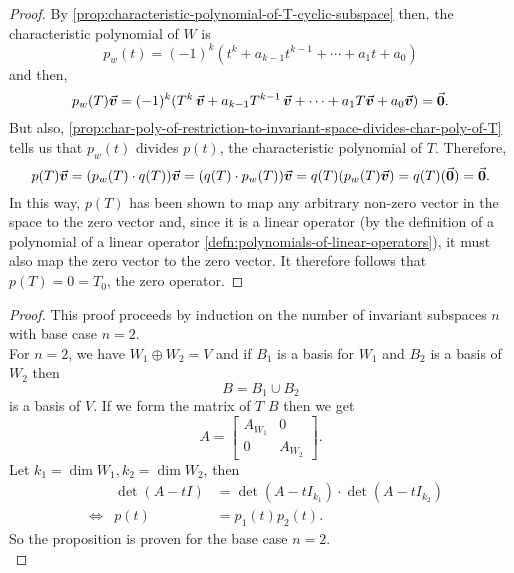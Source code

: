 \documentclass[../MathsNotesBase.tex]{subfiles}
\begin{document}
{\begin{proof}
			By \autoref{prop:characteristic-polynomial-of-T-cyclic-subspace} then, the characteristic polynomial of $W$ is
			\[ p_w(t) = (-1)^k (t^k + a_{k-1} t^{k-1} + \cdots + a_1 t + a_0) \]
			and then,
			\[ p_w(T)\vec{\bm{v}} = (-1)^k (T^k\,\vec{\bm{v}} + a_{k-1} T^{k-1}\,\vec{\bm{v}} + \cdots + a_1 T\vec{\bm{v}} + a_0\vec{\bm{v}}) = \vec{\bm{0}}. \]
			But also, \autoref{prop:char-poly-of-restriction-to-invariant-space-divides-char-poly-of-T} tells us that $p_w(t)$ divides $p(t)$, the characteristic polynomial of $T$. Therefore,
			\[ p(T)\vec{\bm{v}} = (p_w(T) \cdot q(T))\vec{\bm{v}} = (q(T) \cdot p_w(T))\vec{\bm{v}} = q(T)(p_w(T)\vec{\bm{v}}) = q(T)(\vec{\bm{0}}) = \vec{\bm{0}}. \]
			In this way, $p(T)$ has been shown to map any arbitrary non-zero vector in the space to the zero vector and, since it is a linear operator (by the definition of a polynomial of a linear operator \ref{defn:polynomials-of-linear-operators}), it must also map the zero vector to the zero vector. It therefore follows that ${ p(T) = 0 = T_0 }$, the zero operator.
		\end{proof}
	
	
		\bigskip
		\begin{proof}
			This proof proceeds by induction on the number of invariant subspaces $n$ with base case ${ n = 2 }$.\\
			
			For ${ n = 2 }$, we have ${ W_1 \oplus W_2 = V }$ and if $B_1$ is a basis for $W_1$ and $B_2$ is a basis of $W_2$ then
			\[ B = B_1 \cup B_2 \]
			is a basis of $V$. If we form the matrix of $T$ \wrt $B$ then we get
			\[ 
				A = \begin{bmatrix}
						A_{W_1} & 0\\
						0 & A_{W_2}
					\end{bmatrix}.
			\]
			Let ${ k_1 = \dim W_1, k_2 = \dim W_2 }$, then
			\[\begin{aligned}
				&& \det (A - tI) &= \det (A - tI_{k_1}) \cdot \det (A - tI_{k_2}) \\
				&\iff & p(t) &= p_1(t) p_2(t).
			\end{aligned}\]
			So the proposition is proven for the base case ${ n = 2 }$.\\
			

\end{proof}}
\end{document}
